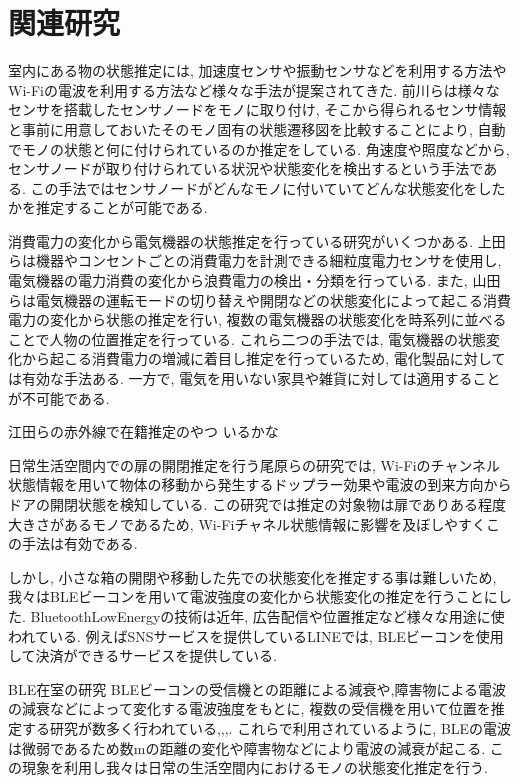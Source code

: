 \documentclass[Japanese]{dicomopapers}
\begin{document}
\section{関連研究}
室内にある物の状態推定には, 加速度センサや振動センサなどを利用する方法やWi-Fiの電波を利用する方法など様々な手法が提案されてきた.
前川ら\cite{TagAndThink}は様々なセンサを搭載したセンサノードをモノに取り付け, そこから得られるセンサ情報と事前に用意しておいたそのモノ固有の状態遷移図を比較することにより, 自動でモノの状態と何に付けられているのか推定をしている.
角速度や照度などから, センサノードが取り付けられている状況や状態変化を検出するという手法である.
この手法ではセンサノードがどんなモノに付いていてどんな状態変化をしたかを推定することが可能である.


消費電力の変化から電気機器の状態推定を行っている研究がいくつかある.
上田ら\cite{sairyu}は機器やコンセントごとの消費電力を計測できる細粒度電力センサを使用し, 電気機器の電力消費の変化から浪費電力の検出・分類を行っている.
また, 山田ら\cite{energy}は電気機器の運転モードの切り替えや開閉などの状態変化によって起こる消費電力の変化から状態の推定を行い, 複数の電気機器の状態変化を時系列に並べることで人物の位置推定を行っている.
これら二つの手法では, 電気機器の状態変化から起こる消費電力の増減に着目し推定を行っているため, 電化製品に対しては有効な手法ある.
一方で, 電気を用いない家具や雑貨に対しては適用することが不可能である.

江田ら\cite{redLine}の赤外線で在籍推定のやつ
いるかな

日常生活空間内での扉の開閉推定を行う尾原ら\cite{WifiChannel}の研究では, Wi-Fiのチャンネル状態情報を用いて物体の移動から発生するドップラー効果や電波の到来方向からドアの開閉状態を検知している.
この研究では推定の対象物は扉でありある程度大きさがあるモノであるため, Wi-Fiチャネル状態情報に影響を及ぼしやすくこの手法は有効である.

しかし, 小さな箱の開閉や移動した先での状態変化を推定する事は難しいため, 我々はBLEビーコンを用いて電波強度の変化から状態変化の推定を行うことにした.
BluetoothLowEnergyの技術は近年, 広告配信や位置推定など様々な用途に使われている.
例えばSNSサービスを提供しているLINEでは, BLEビーコンを使用して決済ができるサービスを提供している.\cite{bleUse}


BLE在室の研究
BLEビーコンの受信機との距離による減衰や,障害物による電波の減衰などによって変化する電波強度をもとに, 複数の受信機を用いて位置を推定する研究が数多く行われている\cite{IoMT},\cite{tandem},\cite{blespot},\cite{LANgate}.
これらで利用されているように, BLEの電波は微弱であるため数mの距離の変化や障害物などにより電波の減衰が起こる.
この現象を利用し我々は日常の生活空間内におけるモノの状態変化推定を行う.
\end{document}
